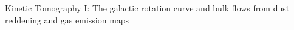 Kinetic Tomography I: The galactic rotation curve and bulk flows from dust reddening and gas emission maps